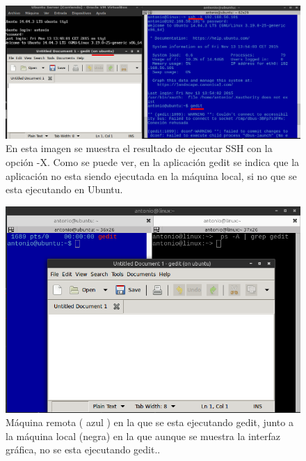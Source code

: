 \begin{figure}[H]
    \begin{center}
    \advance\leftskip-2.5cm
        \includegraphics[scale=0.5]{imagenes/img1}
        \caption{En esta imagen se muestra el resultado de ejecutar SSH con la opción -X. Como se puede ver, en la aplicación gedit se indica que la aplicación no esta siendo ejecutada en la máquina local, si no que se esta ejecutando en Ubuntu.}
        \label{fig1}
    \end{center}
\end{figure}


\begin{figure}[H]
    \begin{center}
    \advance\leftskip-2.5cm
        \includegraphics[scale=0.5]{imagenes/img60}
        \caption{Máquina remota ( azul ) en la que se esta ejecutando gedit, junto a la máquina local (negra) en la que aunque se muestra la interfaz gráfica, no se esta ejecutando gedit..}
        \label{fig57}
    \end{center}
\end{figure}


